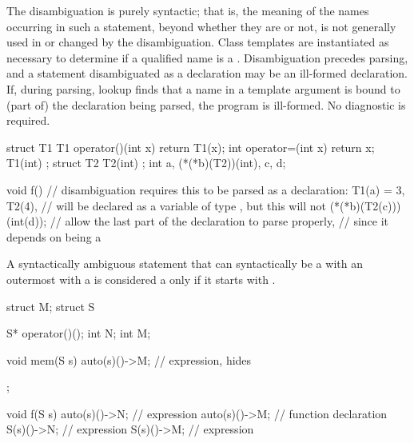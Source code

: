 \pnum
The disambiguation is purely syntactic; that is, the meaning of the
names occurring in such a statement, beyond whether they are
 or not, is not generally used in or changed by the
disambiguation. Class templates are instantiated as necessary to
determine if a qualified name is a . Disambiguation
precedes parsing, and a statement disambiguated as a declaration may be
an ill-formed declaration.
If, during parsing, lookup finds
that a name in a template argument is bound to
(part of) the declaration being parsed,
the program is ill-formed.
No diagnostic is required.
\begin{example}
\begin{codeblock}
struct T1 {
  T1 operator()(int x) { return T1(x); }
  int operator=(int x) { return x; }
  T1(int) { }
};
struct T2 { T2(int) { } };
int a, (*(*b)(T2))(int), c, d;

void f() {
  // disambiguation requires this to be parsed as a declaration:
  T1(a) = 3,
  T2(4),                        //  will be declared as a variable of type , but this will not
  (*(*b)(T2(c)))(int(d));       // allow the last part of the declaration to parse properly,
                                // since it depends on  being a 
}
\end{codeblock}
\end{example}

\pnum
A syntactically ambiguous statement that can syntactically be
a  with an outermost 
with a 
is considered a  only if it starts with .
\begin{example}
\begin{codeblock}
struct M;
struct S {
  S* operator()();
  int N;
  int M;

  void mem(S s) {
    auto(s)()->M;               // expression,  hides 
  }
};

void f(S s) {
  {
    auto(s)()->N;               // expression
    auto(s)()->M;               // function declaration
  }
  {
    S(s)()->N;                  // expression
    S(s)()->M;                  // expression
  }
}
\end{codeblock}
\end{example}
